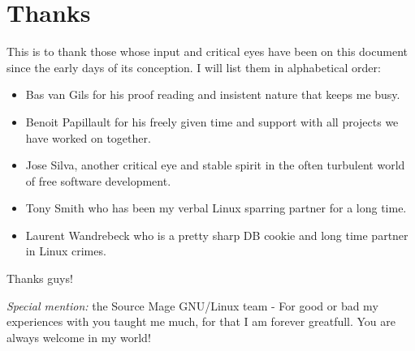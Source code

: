 \newpage
\section{Thanks}
This is to thank those whose input and critical eyes have been on this
document since the early days of its conception. I will list them in
alphabetical order: 

\begin{itemize}
	\item Bas van Gils for his proof reading and insistent nature that keeps me busy.
\item Benoit Papillault for his freely given time and support with all projects we have worked on together.
\item Jose Silva, another critical eye and stable spirit in the often turbulent world of free software development.
\item Tony Smith who has been my verbal Linux sparring partner for a long time.
\item Laurent Wandrebeck who is a pretty sharp DB cookie and long time partner in Linux crimes.
\end{itemize}

Thanks guys!

\emph{Special mention:} the Source Mage GNU/Linux team - For good or bad my experiences with you 
taught me much, for that I am forever greatfull. You are always welcome in my world!
\newpage
